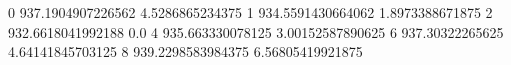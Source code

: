 0 937.1904907226562 4.5286865234375
1 934.5591430664062 1.8973388671875
2 932.6618041992188 0.0
4 935.663330078125 3.00152587890625
6 937.30322265625 4.64141845703125
8 939.2298583984375 6.56805419921875
